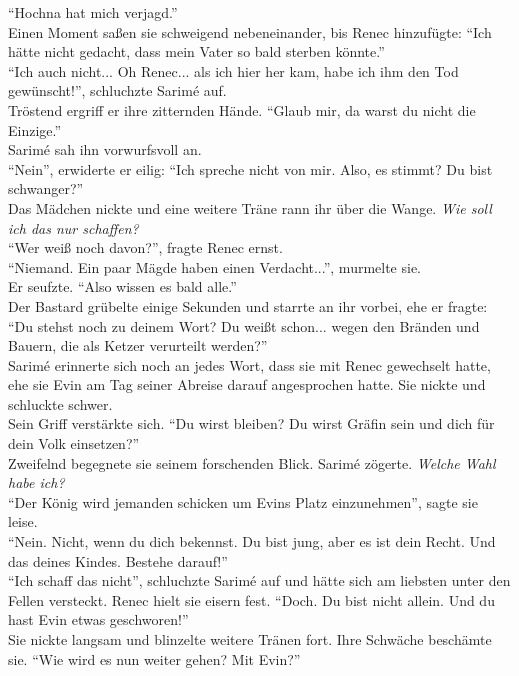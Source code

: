 ``Hochna hat mich verjagd.''\\
Einen Moment saßen sie schweigend nebeneinander, bis Renec hinzufügte: ``Ich hätte nicht gedacht, 
dass mein Vater so bald sterben könnte.''\\
``Ich auch nicht... Oh Renec... als ich hier her kam, habe ich ihm den Tod gewünscht!'', schluchzte 
Sarimé auf.\\
Tröstend ergriff er ihre zitternden Hände. ``Glaub mir, da warst du nicht die Einzige.''\\
Sarimé sah ihn vorwurfsvoll an.\\
``Nein'', erwiderte er eilig: ``Ich spreche nicht von mir. Also, es stimmt? Du bist schwanger?''\\
Das Mädchen nickte und eine weitere Träne rann ihr über die Wange. \textit{Wie soll ich das nur 
schaffen?}\\
``Wer weiß noch davon?'', fragte Renec ernst.\\
``Niemand. Ein paar Mägde haben einen Verdacht...'', murmelte sie.\\
Er seufzte. ``Also wissen es bald alle.''\\
Der Bastard grübelte einige Sekunden und starrte an ihr vorbei, ehe er fragte: ``Du stehst noch zu 
deinem Wort? Du weißt schon... wegen den Bränden und Bauern, die als Ketzer verurteilt werden?''\\
Sarimé erinnerte sich noch an jedes Wort, dass sie mit Renec gewechselt hatte, ehe sie Evin am Tag 
seiner Abreise darauf angesprochen hatte. Sie nickte und schluckte schwer.\\
Sein Griff verstärkte sich. ``Du wirst bleiben? Du wirst Gräfin sein und dich für dein Volk 
einsetzen?''\\
Zweifelnd begegnete sie seinem forschenden Blick. Sarimé zögerte. \textit{Welche Wahl habe ich?}\\
``Der König wird jemanden schicken um Evins Platz einzunehmen'', sagte sie leise.\\
``Nein. Nicht, wenn du dich bekennst. Du bist jung, aber es ist dein Recht. Und das deines Kindes. 
Bestehe darauf!''\\
``Ich schaff das nicht'', schluchzte Sarimé auf und hätte sich am liebsten unter den Fellen 
versteckt. Renec hielt sie eisern fest. ``Doch. Du bist nicht allein. Und du hast Evin etwas 
geschworen!''\\
Sie nickte langsam und blinzelte weitere Tränen fort. Ihre Schwäche beschämte sie. ``Wie wird es nun 
weiter gehen? Mit Evin?''\\
